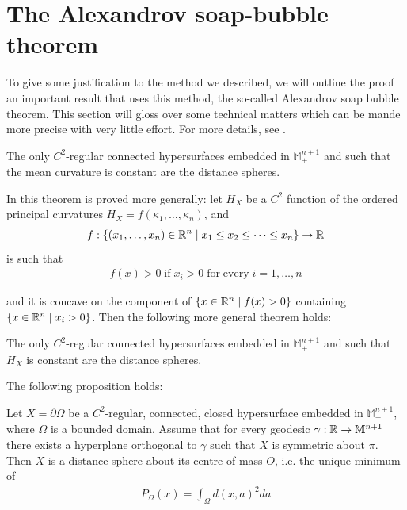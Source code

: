 \section{The Alexandrov soap-bubble theorem}

To give some justification to the method we described, we will outline the proof an important result that uses this method, the so-called Alexandrov soap bubble theorem. This section will gloss over some technical matters which can be mande more precise with very little effort. For more details, see \cite{italiani}. 

\begin{theorem}
	The only $C^2$-regular connected hypersurfaces embedded in $\mathbb{M}^{n+1}_+$ and such that the mean curvature is constant are the distance spheres.\label{Alexandrov theorem} 
\end{theorem}
In \cite{italiani} this theorem is proved more generally: let $H_X$ be a $C^2$ function of the ordered principal curvatures $H_X=f(\kappa_1, \dots, \kappa_n)$, and
\begin{align*}
	f:\{(x_1, \dots, x_n)\in \mathbb{R}^n \;|\;x_1\leq x_2\leq \dots \leq x_n \}\rightarrow \mathbb{R}
\end{align*}
is such that
\begin{align*}
	f(x)>0 \;\mathrm{if \;} x_i>0 \; \mathrm{for \; every \;} i=1, \dots, n
\end{align*}

and it is concave on the component of $\{x\in \mathbb{R}^n \;|\; f(x)>0\}$ containing $\{x\in \mathbb{R}^n \;|\;  x_i>0 \}$. Then the following more general theorem holds: 

\begin{theorem}
	The only $C^2$-regular connected hypersurfaces embedded in $\mathbb{M}^{n+1}_+$ and such that $H_X$ is constant are the distance spheres. 
\end{theorem}

The following proposition holds:

\begin{proposition}
	\label{proposition symmetry conclusion}	Let $X=\partial\Omega$ be a $C^2$-regular, connected, closed hypersurface embedded in $\mathbb{M}^{n+1}_+$, where $\Omega$ is a bounded domain. Assume that for every geodesic $\gamma:\mathbb{R}\rightarrow \mathbb{M}^{n+1}$ there exists a hyperplane orthogonal to $\gamma$ such that $X$ is symmetric about $\pi$. Then $X$ is a distance sphere about its centre of mass $O$, i.e. the unique minimum of 
	\begin{align*}
		P_\Omega(x)=\int_\Omega d(x, a)^2 da
	\end{align*}
\end{proposition}

